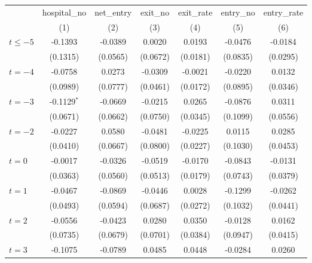\begingroup
\centering
\begin{tabular}{lcccccc}
   \toprule
                          & hospital\_no  & net\_entry  & exit\_no  & exit\_rate  & entry\_no  & entry\_rate \\    
                          & (1)           & (2)         & (3)       & (4)         & (5)        & (6)\\  
   \midrule 
   $t \leq -5$            & -0.1393       & -0.0389     & 0.0020    & 0.0193      & -0.0476    & -0.0184\\   
                          & (0.1315)      & (0.0565)    & (0.0672)  & (0.0181)    & (0.0835)   & (0.0295)\\   
   $t = -4$               & -0.0758       & 0.0273      & -0.0309   & -0.0021     & -0.0220    & 0.0132\\   
                          & (0.0989)      & (0.0777)    & (0.0461)  & (0.0172)    & (0.0895)   & (0.0346)\\   
   $t = -3$               & -0.1129$^{*}$ & -0.0669     & -0.0215   & 0.0265      & -0.0876    & 0.0311\\   
                          & (0.0671)      & (0.0662)    & (0.0750)  & (0.0345)    & (0.1099)   & (0.0556)\\   
   $t = -2$               & -0.0227       & 0.0580      & -0.0481   & -0.0225     & 0.0115     & 0.0285\\   
                          & (0.0410)      & (0.0667)    & (0.0800)  & (0.0227)    & (0.1030)   & (0.0453)\\   
   $t = 0$                & -0.0017       & -0.0326     & -0.0519   & -0.0170     & -0.0843    & -0.0131\\   
                          & (0.0363)      & (0.0560)    & (0.0513)  & (0.0179)    & (0.0743)   & (0.0379)\\   
   $t = 1$                & -0.0467       & -0.0869     & -0.0446   & 0.0028      & -0.1299    & -0.0262\\   
                          & (0.0493)      & (0.0594)    & (0.0687)  & (0.0272)    & (0.1032)   & (0.0441)\\   
   $t = 2$                & -0.0556       & -0.0423     & 0.0280    & 0.0350      & -0.0128    & 0.0162\\   
                          & (0.0735)      & (0.0679)    & (0.0701)  & (0.0384)    & (0.0947)   & (0.0415)\\   
   $t = 3$                & -0.1075       & -0.0789     & 0.0485    & 0.0448      & -0.0284    & 0.0260\\   

\end{tabular}
